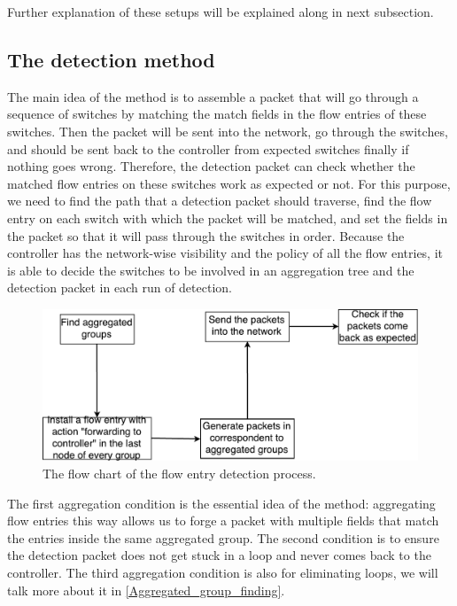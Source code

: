 Further explanation of these setups will be explained along in next subsection.

\subsection{The detection method}
\label{Detection_method}

The main idea of the method is to assemble a packet that will go through a sequence of switches by matching the match fields in the flow entries of these switches. Then the packet will be sent into the network, go through the switches, and should be sent back to the controller from expected switches finally if nothing goes wrong. Therefore, the detection packet can check whether the matched flow entries on these switches work as expected or not. For this purpose, we need to find the path that a detection packet should traverse, find the flow entry on each switch with which the packet will be matched, and set the fields in the packet so that it will pass through the switches in order. Because the controller has the network-wise visibility and the policy of all the flow entries, it is able to decide the switches to be involved in an aggregation tree and the detection packet in each run of detection. 

\begin{figure}[H]
\begin{center} 
\includegraphics[width=1\textwidth]{figures/flow_entry_detection_flowchart.pdf}
\end{center}
\caption{The flow chart of the flow entry detection process.}
\label{flow_entry_detection_flowchart}
\end{figure}

The first aggregation condition is the essential idea of the method: aggregating flow entries this way allows us to forge a packet with multiple fields that match the entries inside the same aggregated group. The second condition is to ensure the detection packet does not get stuck in a loop and never comes back to the controller. The third aggregation condition is also for eliminating loops, we will talk more about it in \ref{Aggregated_group_finding}.

